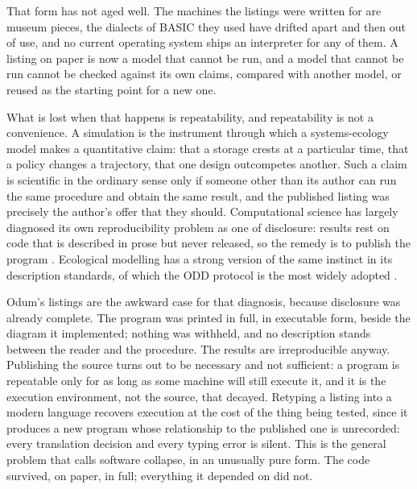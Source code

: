 That form has not aged well. The machines the listings were written for are museum pieces, the dialects of BASIC they used have drifted apart and then out of use, and no current operating system ships an interpreter for any of them. A listing on paper is now a model that cannot be run, and a model that cannot be run cannot be checked against its own claims, compared with another model, or reused as the starting point for a new one.

What is lost when that happens is repeatability, and repeatability is not a convenience. A simulation is the instrument through which a systems-ecology model makes a quantitative claim: that a storage crests at a particular time, that a policy changes a trajectory, that one design outcompetes another. Such a claim is scientific in the ordinary sense only if someone other than its author can run the same procedure and obtain the same result, and the published listing was precisely the author's offer that they should. Computational science has largely diagnosed its own reproducibility problem as one of disclosure: results rest on code that is described in prose but never released, so the remedy is to publish the program \citep{ince2012,peng2011}. Ecological modelling has a strong version of the same instinct in its description standards, of which the ODD protocol is the most widely adopted \citep{grimm2010}.

Odum's listings are the awkward case for that diagnosis, because disclosure was already complete. The program was printed in full, in executable form, beside the diagram it implemented; nothing was withheld, and no description stands between the reader and the procedure. The results are irreproducible anyway. Publishing the source turns out to be necessary and not sufficient: a program is repeatable only for as long as some machine will still execute it, and it is the execution environment, not the source, that decayed. Retyping a listing into a modern language recovers execution at the cost of the thing being tested, since it produces a new program whose relationship to the published one is unrecorded: every translation decision and every typing error is silent. This is the general problem that \citet{hinsen2019} calls software collapse, in an unusually pure form. The code survived, on paper, in full; everything it depended on did not.

